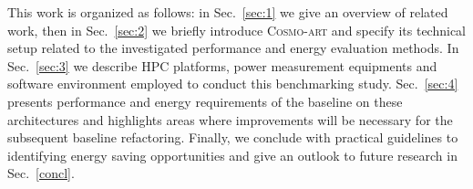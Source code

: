 This  work is  organized as  follows: in  Sec.~\ref{sec:1} we  give an
overview  of  related  work,   then  in  Sec.~\ref{sec:2}  we  briefly
introduce \textsc{Cosmo-art}  and specify its  technical setup related
to  the investigated  performance and  energy evaluation  methods.  In
Sec.~\ref{sec:3}   we  describe   HPC  platforms,   power  measurement
equipments   and  software  environment   employed  to   conduct  this
benchmarking study.  Sec.~\ref{sec:4}  presents performance and energy
requirements  of the  baseline on  these architectures  and highlights
areas where improvements will be necessary for the subsequent baseline
refactoring.   Finally,  we  conclude  with  practical  guidelines  to
identifying energy saving opportunities  and give an outlook to future
research in Sec.~\ref{concl}.
